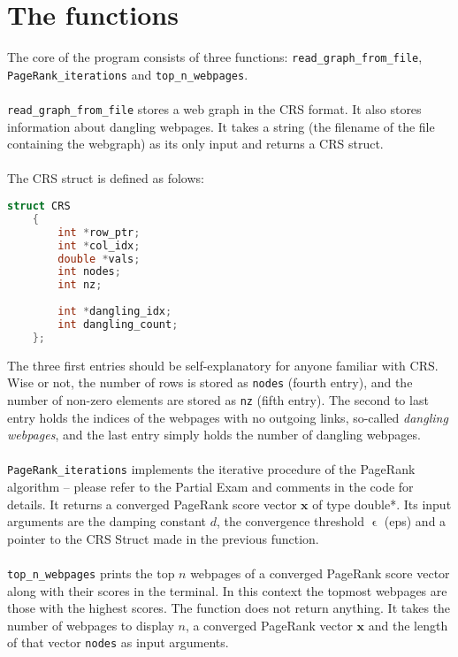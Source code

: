 \documentclass{in1150-innlevering}
\begin{document}
\section*{The functions}
\label{sec:the_functions}
	The core of the program consists of three functions: \texttt{read\_graph\_from\_file}, \texttt{PageRank\_iterations} and \texttt{top\_n\_webpages}.\\
	\\
	\texttt{read\_graph\_from\_file} stores a web graph in the CRS format. It also stores information about dangling webpages. It takes a string (the filename of the file containing the webgraph) as its only input and returns a CRS struct.\\
	\\The CRS struct is defined as folows:
	\begin{lstlisting}[language=C]
	struct CRS
	{
		int *row_ptr;
		int *col_idx;
		double *vals;
		int nodes;
		int nz;
		
		int *dangling_idx;
		int dangling_count;
	};
	\end{lstlisting}
	The three first entries should be self-explanatory for anyone familiar with CRS. Wise or not, the number of rows is stored as \texttt{nodes} (fourth entry), and the number of non-zero elements are stored as \texttt{nz} (fifth entry). The second to last entry holds the indices of the webpages with no outgoing links, so-called \emph{dangling webpages}, and the last entry simply holds the number of dangling webpages.\\
	\\
	\texttt{PageRank\_iterations} implements the iterative procedure of the PageRank algorithm -- please refer to the Partial Exam and comments in the code for details. It returns a converged PageRank score vector $\mathbf{x}$ of type double*. Its input arguments are the damping constant $d$, the convergence threshold $\upvarepsilon$ (eps) and a pointer to the CRS Struct made in the previous function.\\
	\\
	\texttt{top\_n\_webpages} prints the top $n$ webpages of a converged PageRank score vector along with their scores in the terminal. In this context the topmost webpages are those with the highest scores. The function does not return anything. It takes the number of webpages to display $n$, a converged PageRank vector $\mathbf{x}$ and the length of that vector \texttt{nodes} as input arguments.
\end{document}
